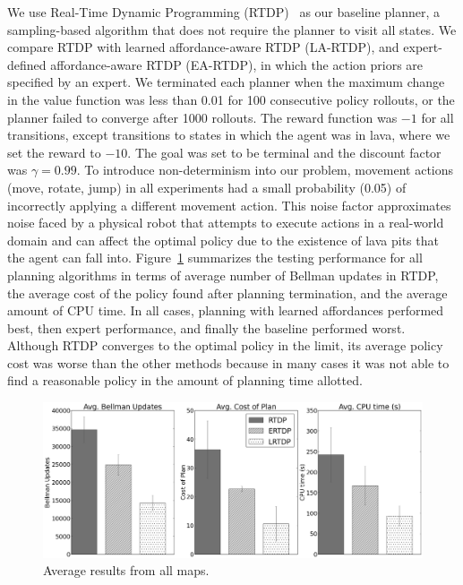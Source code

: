 We use Real-Time Dynamic Programming (RTDP)~\cite{barto95} as our
baseline planner, a sampling-based algorithm that does not require the
planner to visit all states. We compare RTDP with learned
affordance-aware RTDP (LA-RTDP), and expert-defined affordance-aware
RTDP (EA-RTDP), in which the action priors are specified by an expert. 
We terminated each planner when the maximum change in
the value function was less than 0.01 for 100 consecutive policy
rollouts, or the planner failed to converge after 1000 rollouts.  The
reward function was $-1$ for all transitions, except transitions to
states in which the agent was in lava, where we set the reward to
$-10$. The goal was set to be terminal and the discount factor was
$\gamma = 0.99$.  To introduce non-determinism into our problem,
movement actions (move, rotate, jump) in all experiments had a small
probability (0.05) of incorrectly applying a different movement
action.  This noise factor approximates noise faced by a physical
robot that attempts to execute actions in a real-world domain and
can affect the optimal policy due to the existence of lava pits
that the agent can fall into. Figure~\ref{fig:average_results}
summarizes the testing performance for all planning algorithms
in terms of average number of Bellman updates in RTDP, the average
cost of the policy found after planning termination, and the average
amount of CPU time. In all cases, planning with learned affordances
performed best, then expert performance, and finally the baseline
performed worst. Although RTDP converges to the optimal policy in the
limit, its average policy cost was worse than the other methods because
in many cases it was not able to find a reasonable policy in the
amount of planning time allotted.


\begin{figure}[t]
\centering
\includegraphics[width=0.3\linewidth]{figures/average_results_cropped.png}%
\caption{Average results from all maps.}
\label{fig:average_results}
\end{figure}

